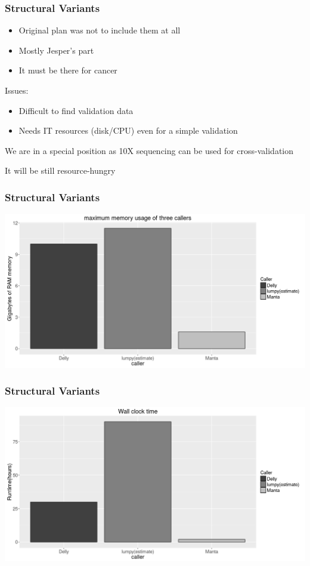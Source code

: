 \documentclass{beamer}
\begin{document}
\begin{frame}
\frametitle{Structural Variants}
\begin{itemize}
	\item Original plan was not to include them at all
	\item Mostly Jesper's part
	\item It must be there for cancer
\end{itemize}
\begin{block}{Issues:}
\begin{itemize}
	\item Difficult to find validation data
	\item Needs IT resources (disk/CPU) even for a simple validation
\end{itemize}
We are in a special position as 10X sequencing can be used for cross-validation

It will be still resource-hungry
\end{block}
\end{frame}

\begin{frame}
\frametitle{Structural Variants}
\includegraphics[width=1.0\linewidth]{memory_usage.png}
\end{frame}

\begin{frame}
\frametitle{Structural Variants}
\includegraphics[width=1.0\linewidth]{wall_clock.png}
\end{frame}
\end{document}
